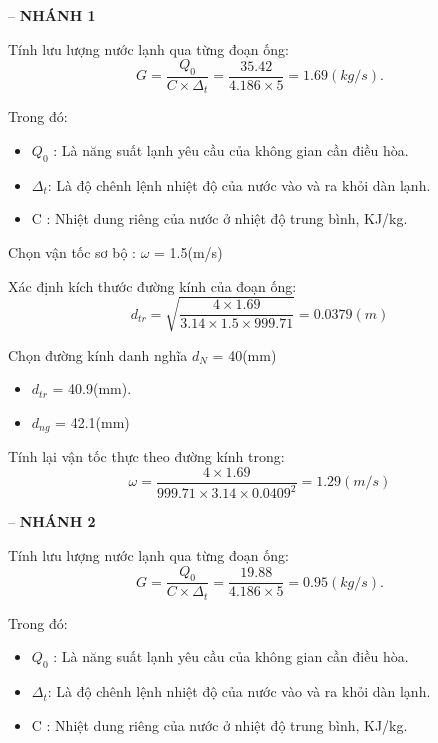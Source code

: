 -- \textbf{NHÁNH 1}

Tính lưu lượng nước lạnh qua từng đoạn ống:
\begin{equation*}
	G = \dfrac{Q_{0}}{C \times \Delta_{t}} =\dfrac{35.42}{4.186 \times 5} = 1.69(kg/s).
\end{equation*}

Trong đó:
\begin{itemize}
	\item $Q_{0}$ : Là năng suất lạnh yêu cầu của không gian cần điều hòa.
	\item $\Delta_{t}$: Là độ chênh lệnh nhiệt độ của nước vào và ra khỏi dàn lạnh.
	\item C : Nhiệt dung riêng của nước ở nhiệt độ trung bình, KJ/kg.
\end{itemize}

Chọn vận tốc sơ bộ : $\omega$ = 1.5(m/s)

Xác định kích thước đường kính của đoạn ống:
\begin{equation*}
	d_{tr} = \sqrt{\dfrac{4 \times 1.69}{3.14 \times 1.5 \times 999.71}} = 0.0379(m)
\end{equation*}

Chọn đường kính danh nghĩa $d_{N}$ = 40(mm)
\begin{itemize}
	\item $d_{tr}$ = 40.9(mm).
	\item $d_{ng}$ = 42.1(mm)
\end{itemize}

Tính lại vận tốc thực theo đường kính trong:
\begin{equation*}
	\omega = \dfrac{4 \times 1.69 }{999.71 \times 3.14 \times 0.0409^{2}} = 1.29(m/s)
\end{equation*}

-- \textbf{NHÁNH 2}

Tính lưu lượng nước lạnh qua từng đoạn ống:
\begin{equation*}
	G = \dfrac{Q_{0}}{C \times \Delta_{t}} =\dfrac{19.88}{4.186 \times 5} = 0.95(kg/s).
\end{equation*}

Trong đó:
\begin{itemize}
	\item $Q_{0}$ : Là năng suất lạnh yêu cầu của không gian cần điều hòa.
	\item $\Delta_{t}$: Là độ chênh lệnh nhiệt độ của nước vào và ra khỏi dàn lạnh.
	\item C : Nhiệt dung riêng của nước ở nhiệt độ trung bình, KJ/kg.
\end{itemize}

